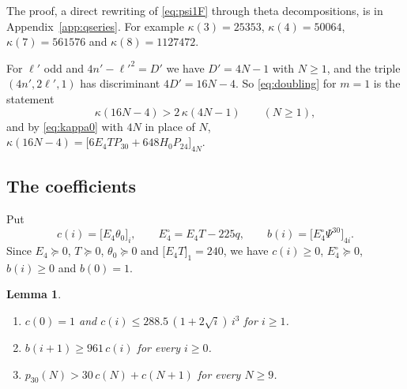\documentclass[11pt]{amsart}
\newtheorem{lemma}[theorem]{Lemma}
\theoremstyle{definition}
\newcommand{\coef}[2]{\big[#1\big]_{#2}}
\begin{document}
The proof, a direct rewriting of \eqref{eq:psi1F} through theta decompositions, is in Appendix~\ref{app:qseries}. For example $\kappa(3)=25353$, $\kappa(4)=50064$, $\kappa(7)=561576$ and $\kappa(8)=1127472$.

For $\ell'$ odd and $4n'-\ell'^2=D'$ we have $D'=4N-1$ with $N\ge1$, and the triple $(4n',2\ell',1)$ has discriminant $4D'=16N-4$. So \eqref{eq:doubling} for $m=1$ is the statement
\begin{equation}\label{eq:I1}
\kappa(16N-4)>2\,\kappa(4N-1)\qquad(N\ge1),
\end{equation}
and by \eqref{eq:kappa0} with $4N$ in place of $N$, $\kappa(16N-4)=\coef{6E_4TP_{30}+648H_0P_{24}}{4N}$.

\subsection{The coefficients}
Put
\[
c(i)=\coef{E_4\theta_0}{i},\qquad E_4^\circ=E_4T-225q,\qquad b(i)=\coef{E_4^\circ\Psi^{30}}{4i}.
\]
Since $E_4\succeq0$, $T\succeq0$, $\theta_0\succeq0$ and $\coef{E_4T}1=240$, we have $c(i)\ge0$, $E_4^\circ\succeq0$, $b(i)\ge0$ and $b(0)=1$.

\begin{lemma}\label{lem:m1bounds}
\begin{enumerate}
\item[(a)] $c(0)=1$ and $c(i)\le288.5\,(1+2\sqrt i)\,i^3$ for $i\ge1$.
\item[(b)] $b(i+1)\ge961\,c(i)$ for every $i\ge0$.
\item[(c)] $p_{30}(N)>30\,c(N)+c(N+1)$ for every $N\ge9$.
\end{enumerate}
\end{lemma}
\end{document}
